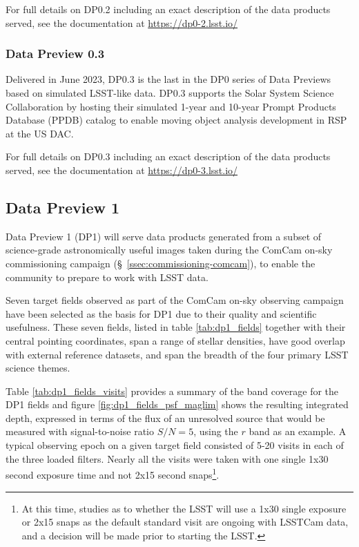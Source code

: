 For full details on DP0.2 including an exact description of the data products served, see the documentation at \url{https://dp0-2.lsst.io/}

\subsubsection{Data Preview 0.3}
\label{sec:dp03}

Delivered in June  2023, DP0.3 is the last in the DP0 series of Data Previews based on simulated LSST-like data. 
DP0.3 supports the Solar System Science Collaboration by hosting their simulated 1-year and 10-year Prompt Products Database (PPDB) catalog to enable moving object analysis development  in  RSP at the US DAC. 

For full details on DP0.3 including an exact description of the data products served, see the documentation at \url{https://dp0-3.lsst.io/}

\subsection{Data Preview 1}
\label{sec:dp1}

Data Preview 1 (DP1) will serve data products generated from a subset of science-grade astronomically useful images  taken  during  the ComCam on-sky commissioning campaign (\S~\ref{ssec:commissioning-comcam}), to enable the community to prepare to work with LSST data. 

Seven target fields observed as part of the ComCam on-sky observing campaign  have been selected as the basis for DP1 due to their quality and scientific usefulness.  
These seven fields, listed in table \ref{tab:dp1_fields} together with their central pointing coordinates, span a range of stellar densities, have good overlap with external reference datasets, and span the breadth of the four primary LSST science themes.


Table \ref{tab:dp1_fields_visits} provides a summary of the band coverage for the DP1 fields and figure \ref{fig:dp1_fields_psf_maglim} shows the
resulting integrated depth, expressed in terms of the flux of an unresolved source that would be measured with signal-to-noise ratio $S/N = 5$, using the $r$ band as an example.
A typical observing epoch on a given target field consisted of 5-20 visits in each of the three loaded filters.
Nearly all the visits  were taken with one single 1x30 second exposure time and not  2x15 second snaps\footnote{At this time, studies as to whether the LSST will use a 1x30 single exposure or 2x15 snaps as the default standard visit are ongoing with LSSTCam data, and a decision will be made prior to starting the LSST. }.


